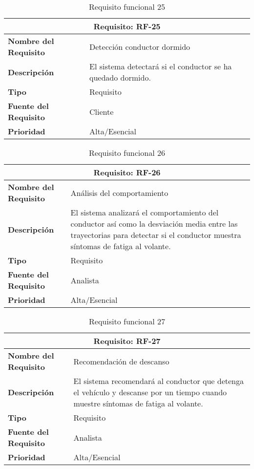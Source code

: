 \begin{table}[H]
\begin{center}
\begin{tabular}{p{} p{7cm}}
\multicolumn{2}{c}{\textbf{Requisito: RF-25} } \\
\hline \hline
\textbf{Nombre del Requisito} & Detección conductor dormido\\
\hline
\textbf{Descripción} & El sistema detectará si el conductor se ha quedado dormido.\\
\hline
\textbf{Tipo} & Requisito  \\
\hline
\textbf{Fuente del Requisito} & Cliente  \\
\hline
\textbf{Prioridad} & Alta/Esencial  \\ \hline
\end{tabular}
\caption{Requisito funcional 25}
\label{tab:RF-25}
\end{center}
\end{table}



\begin{table}[H]
\begin{center}
\begin{tabular}{p{} p{7cm}}
\multicolumn{2}{c}{\textbf{Requisito: RF-26} } \\
\hline \hline
\textbf{Nombre del Requisito} & Análisis del comportamiento\\
\hline
\textbf{Descripción} & El sistema analizará el comportamiento del conductor así como la desviación media entre las trayectorias para detectar si el conductor muestra síntomas de fatiga al volante.\\
\hline
\textbf{Tipo} & Requisito  \\
\hline
\textbf{Fuente del Requisito} & Analista  \\
\hline
\textbf{Prioridad} & Alta/Esencial  \\ \hline
\end{tabular}
\caption{Requisito funcional 26}
\label{tab:RF-26}
\end{center}
\end{table}

\begin{table}[H]
\begin{center}
\begin{tabular}{p{} p{7cm}}
\multicolumn{2}{c}{\textbf{Requisito: RF-27} } \\
\hline \hline
\textbf{Nombre del Requisito} & Recomendación de descanso\\
\hline
\textbf{Descripción} & El sistema recomendará al conductor que detenga el vehículo y descanse por un tiempo cuando muestre síntomas de fatiga al volante. \\
\hline
\textbf{Tipo} & Requisito  \\
\hline
\textbf{Fuente del Requisito} & Analista  \\
\hline
\textbf{Prioridad} & Alta/Esencial  \\ \hline
\end{tabular}
\caption{Requisito funcional 27}
\label{tab:RF-27}
\end{center}
\end{table}

